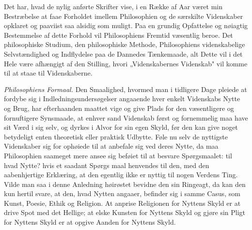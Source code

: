 \documentclass[12pt]{book}
\begin{document}
Det har, hvad de nylig anførte Skrifter vise, i en Række af Aar været min
Bestræbelse at faae Forholdet imellem Philosophien og de særskilte Videnskaber
opklaret og paaviist saa alsidig som muligt. Paa en grundig Opfattelse og nøiagtig
Bestemmelse af dette Forhold vil Philosophiens Fremtid væsentlig beroe. Det
philosophiske Studium, den philosophiske Methode, Philosophiens videnskabelige
Selvstændighed og Indflydelse paa de Dannedes Tænkemaade, alt Dette vil i det Hele
være afhængigt af den Stilling, hvori „Videnskabernes Videnskab" vil komme til at
staae til Videnskaberne.

\emph{Philosophiens Formaal.} Den Smaalighed, hvormed man i tidligere Dage pleiede
at fordybe sig i Indledningsundersøgelser angaaende hver enkelt Videnskabs Nytte og
Brug, har efterhaanden maattet vige og give Plads for den væsentligere og
fornuftigere Synsmaade, at enhver sand Videnskab først og fornemmelig maa have sit
Værd i sig selv, og dyrkes i Alvor for sin egen Skyld, før den kan give noget
betydeligt enten theoretisk eller praktisk Udbytte. Føle nu selv de nyttigste
Videnskaber sig for ophøiede til at anbefale sig ved deres Nytte, da maa
Philosophien saameget mere ansee sig beføiet til at besvare Spørgsmaalet: til hvad
Nytte? hvis et saadant Spørgs%
maal henvendes til den, med den aabenhjertige Erklæring, at den egentlig ikke er
nyttig til nogen Verdens Ting. Vilde man saa i denne Anledning høirøstet bevidne
den sin Ringeagt, da kan den kun hertil svare, at den, hvad Nytten angaaer,
befinder sig i samme Casus, som Kunst, Poesie, Ethik og Religion. At anprise
Religionen for Nyttens Skyld er at drive Spot med det Hellige; at elske Kunsten for
Nyttens Skyld og gjøre sin Pligt for Nyttens Skyld er at opgive Aanden for Nyttens
Skyld.
\end{document}

